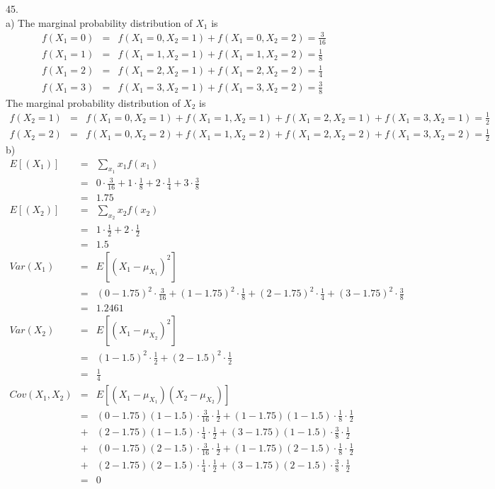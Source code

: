 \documentclass[12pt]{article}
\begin{document}
45. \\
a) The marginal probability distribution of $X_1$ is
\begin{eqnarray*}
  f(X_1 = 0) &=& f(X_1 = 0, X_2 = 1) + f(X_1 = 0, X_2 = 2) = \frac {3}{16} \\ 
  f(X_1 = 1) &=& f(X_1 = 1, X_2 = 1) + f(X_1 = 1, X_2 = 2) = \frac {1}{8} \\ 
  f(X_1 = 2) &=& f(X_1 = 2, X_2 = 1) + f(X_1 = 2, X_2 = 2) = \frac {1}{4} \\ 
  f(X_1 = 3) &=& f(X_1 = 3, X_2 = 1) + f(X_1 = 3, X_2 = 2) = \frac {3}{8}
\end{eqnarray*}
The marginal probability distribution of $X_2$ is
\begin{eqnarray*}
  f(X_2 = 1) &=& f(X_1 = 0, X_2 = 1) + f(X_1 = 1, X_2 = 1) 
    + f(X_1 = 2, X_2 = 1) + f(X_1 = 3, X_2 = 1) = \frac {1}{2} \\ 
  f(X_2 = 2) &=& f(X_1 = 0, X_2 = 2) + f(X_1 = 1, X_2 = 2)
    + f(X_1 = 2, X_2 = 2) + f(X_1 = 3, X_2 = 2) = \frac {1}{2}
\end{eqnarray*}
b)
\begin{eqnarray*}
  E[(X_1)] &=& \sum_{x_1} x_1 f(x_1) \\
           &=& 0 \cdot \frac {3}{16} + 1 \cdot \frac{1}{8}
               + 2 \cdot \frac {1}{4} + 3 \cdot \frac{3}{8} \\
           &=& 1.75 \\
  E[(X_2)] &=& \sum_{x_2} x_2 f(x_2) \\
           &=& 1 \cdot \frac{1}{2} + 2 \cdot \frac {1}{2} \\
           &=& 1.5 \\
  Var(X_1) &=& E[(X_1 - \mu_{X_1})^2] \\
           &=& (0 - 1.75)^2 \cdot \frac {3}{16}
               + (1 - 1.75)^2 \cdot \frac {1}{8}
               + (2 - 1.75)^2 \cdot \frac {1}{4}
               + (3 - 1.75)^2 \cdot \frac {3}{8} \\
           &=& 1.2461 \\
  Var(X_2) &=& E[(X_1 - \mu_{X_2})^2] \\
           &=& (1 - 1.5)^2 \cdot \frac {1}{2}
               + (2 - 1.5)^2 \cdot \frac {1}{2} \\
           &=& \frac {1}{4} \\
  Cov(X_1, X_2)
  &=& E[(X_1 - \mu_{X_1})(X_2 - \mu_{X_2})] \\
  &=& (0 - 1.75)(1 - 1.5) \cdot \frac {3}{16} \cdot \frac {1}{2}
      + (1 - 1.75)(1 - 1.5) \cdot \frac {1}{8} \cdot \frac {1}{2} \\
  &+& (2 - 1.75)(1 - 1.5) \cdot \frac {1}{4} \cdot \frac {1}{2}
      + (3 - 1.75)(1 - 1.5) \cdot \frac {3}{8} \cdot \frac {1}{2} \\
  &+& (0 - 1.75)(2 - 1.5) \cdot \frac {3}{16} \cdot \frac {1}{2}
      + (1 - 1.75)(2 - 1.5) \cdot \frac {1}{8} \cdot \frac {1}{2} \\
  &+& (2 - 1.75)(2 - 1.5) \cdot \frac {1}{4} \cdot \frac {1}{2}
      + (3 - 1.75)(2 - 1.5) \cdot \frac {3}{8} \cdot \frac {1}{2} \\
  &=& 0
\end{eqnarray*}
\end{document}
